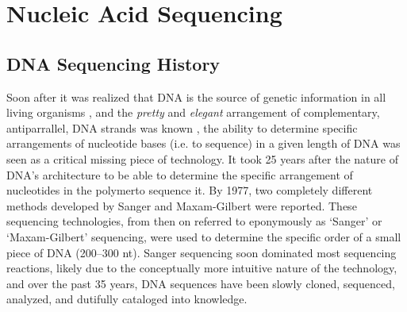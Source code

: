 \section{Nucleic Acid Sequencing}
\subsection{DNA Sequencing History}\label{sec:DNA Sequencing History} %

Soon after it was realized that DNA is the source of genetic information in all living organisms \citep{Watson1953a}, and the \textit{pretty} and \textit{elegant} arrangement of complementary, antiparrallel, DNA strands was known \citep{Watson2012a}, the ability to determine specific arrangements of nucleotide bases (i.e. to sequence) in a given length of DNA was seen as a critical missing piece of technology. It took 25 years after the nature of DNA's architecture to be able to determine the specific arrangement of nucleotides in the polymer\textemdash to sequence it. By 1977, two completely different methods developed by Sanger \citep{Sanger1975a,Sanger1977b} and Maxam-Gilbert \citep{Maxam1977a} were reported. These sequencing technologies, from then on referred to eponymously as ‘Sanger’ or ‘Maxam-Gilbert’ sequencing, were used to determine the specific order of a small piece of DNA (200–300 nt). Sanger sequencing soon dominated most sequencing reactions, likely due to the conceptually more intuitive nature of the technology, and over the past 35 years, DNA sequences have been slowly cloned, sequenced, analyzed, and dutifully cataloged into knowledge.

